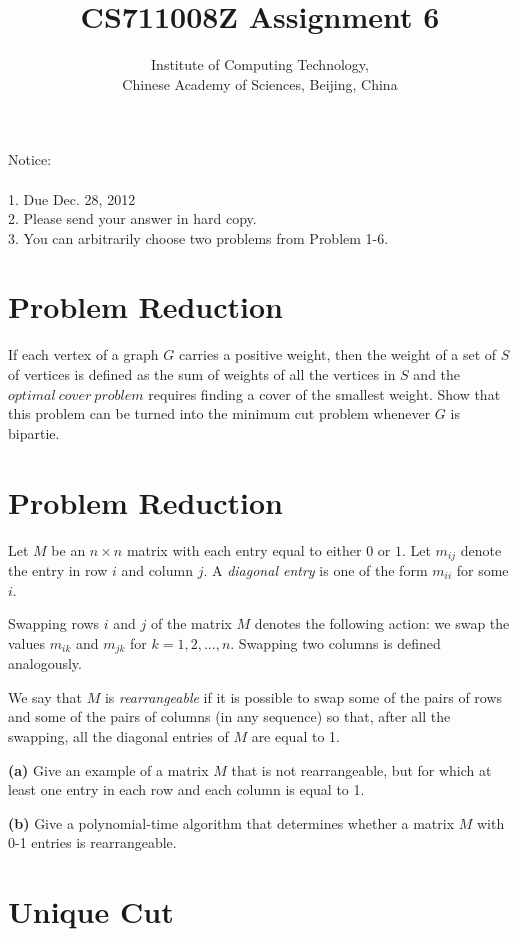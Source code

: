 \documentclass[a4paper,10pt]{article}
\title{CS711008Z Assignment 6}
\author{Institute of Computing Technology, \\
                       Chinese Academy of Sciences, Beijing, China }
\begin{document}
\maketitle

Notice:\\\\
1. Due Dec. 28, 2012\\
2. Please send your answer in hard copy.\\
3. You can arbitrarily choose two problems from Problem 1-6.\\



\section{Problem Reduction}

If each vertex of a graph $G$ carries a positive weight, then the weight of a set of $S$ of vertices is defined as the sum of weights of all the vertices in $S$ and the $optimal\ cover\ problem$ requires finding a cover of the smallest weight. Show that this problem can be turned into the minimum cut problem whenever $G$ is bipartie.

\section{Problem Reduction}

Let $M$ be an $n\times n$ matrix with each entry equal to either $0$ or $1$. Let $m_{ij}$ denote the entry in row $i$ and column $j$. A \emph{diagonal entry} is one of the form $m_{ii}$ for some $i$.

Swapping rows $i$ and $j$ of the matrix $M$ denotes the following action: we swap the values $m_{ik}$ and $m_{jk}$ for $k=1,2,...,n$. Swapping two columns is defined analogously.

We say that $M$ is \emph{rearrangeable} if it is possible to swap some of the pairs of rows and some of the pairs of columns (in any sequence) so that, after all the swapping, all the diagonal entries of $M$ are equal to 1.

{\bf (a)} Give an example of a matrix $M$ that is not rearrangeable, but for which at least one entry in each row and each column is equal to 1.

{\bf (b)} Give a polynomial-time algorithm that determines whether a matrix $M$ with 0-1 entries is rearrangeable.

\section{Unique Cut}
\end{document}

